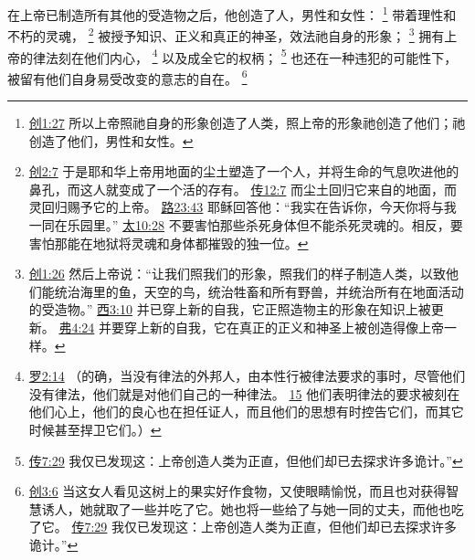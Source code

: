 \documentclass[12pt, a4paper, oneside]{ctexart}
\newcounter{parnum}[section]
\newcommand{\N}{%
   \noindent\refstepcounter{parnum}%
    \makebox[\parindent][l]{\textbf{\arabic{parnum}.}}}
\begin{document}
\N 在上帝已制造所有其他的受造物之后，他创造了人，男性和女性：
	\footnote {
		\href{https://biblehub.com/genesis/1-27.htm}{创1:27} 所以上帝照祂自身的形象创造了人类，照上帝的形象祂创造了他们；祂创造了他们，男性和女性。
	}
	带着理性和不朽的灵魂，
	\footnote {
		\href{https://biblehub.com/genesis/2-7.htm}{创2:7} 于是耶和华上帝用地面的尘土塑造了一个人，并将生命的气息吹进他的鼻孔，而这人就变成了一个活的存有。
		\href{https://biblehub.com/ecclesiastes/12-7.htm}{传12:7} 而尘土回归它来自的地面，而灵回归赐予它的上帝。
		\href{https://biblehub.com/luke/23-43.htm}{路23:43} 耶稣回答他：“我实在告诉你，今天你将与我一同在乐园里。”
		\href{https://biblehub.com/matthew/10-28.htm}{太10:28} 不要害怕那些杀死身体但不能杀死灵魂的。相反，要害怕那能在地狱将灵魂和身体都摧毁的独一位。
	}
	被授予知识、正义和真正的神圣，效法祂自身的形象；
	\footnote {
		\href{https://biblehub.com/genesis/1-26.htm}{创1:26} 然后上帝说：“让我们照我们的形象，照我们的样子制造人类，以致他们能统治海里的鱼，天空的鸟，统治牲畜和所有野兽，并统治所有在地面活动的受造物。”
		\href{https://biblehub.com/colossians/3-10.htm}{西3:10} 并已穿上新的自我，它正照造物主的形象在知识上被更新。
		\href{https://biblehub.com/ephesians/4-24.htm}{弗4:24} 并要穿上新的自我，它在真正的正义和神圣上被创造得像上帝一样。
	}
	拥有上帝的律法刻在他们内心，
	\footnote {
		\href{https://biblehub.com/romans/2-14.htm}{罗2:14} （的确，当没有律法的外邦人，由本性行被律法要求的事时，尽管他们没有律法，他们就是对他们自己的一种律法。
		\href{https://biblehub.com/romans/2-15.htm}{15} 他们表明律法的要求被刻在他们心上，他们的良心也在担任证人，而且他们的思想有时控告它们，而其它时候甚至捍卫它们。）
	}
	以及成全它的权柄；
	\footnote {
		\href{https://biblehub.com/ecclesiastes/7-29.htm}{传7:29} 我仅已发现这：上帝创造人类为正直，但他们却已去探求许多诡计。”
	}
	也还在一种违犯的可能性下，被留有他们自身易受改变的意志的自在。
	\footnote {
		\href{https://biblehub.com/genesis/3-6.htm}{创3:6} 当这女人看见这树上的果实好作食物，又使眼睛愉悦，而且也对获得智慧诱人，她就取了一些并吃了它。她也将一些给了与她一同的丈夫，而他也吃了它。
		\href{https://biblehub.com/ecclesiastes/7-29.htm}{传7:29} 我仅已发现这：上帝创造人类为正直，但他们却已去探求许多诡计。”
	}
\end{document}
